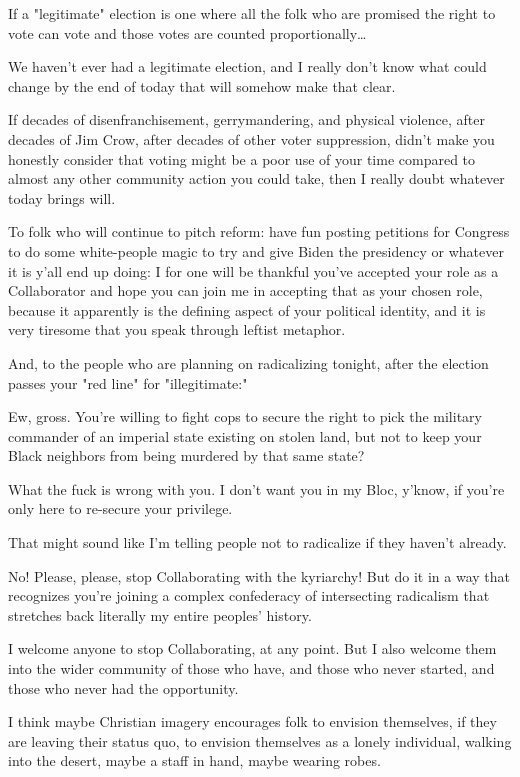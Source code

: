 \documentclass[11pt]{article}
\begin{document}
\begin{itemize}
If a "legitimate" election is one where all the folk who are promised the right to vote can vote and those votes are counted proportionally…

We haven't ever had a legitimate election, and I really don't know what could change by the end of today that will somehow make that clear.

If decades of disenfranchisement, gerrymandering, and physical violence, after decades of Jim Crow, after decades of other voter suppression, didn't make you honestly consider that voting might be a poor use of your time compared to almost any other community action you could take, then I really doubt whatever today brings will.

To folk who will continue to pitch reform: have fun posting petitions for Congress to do some white-people magic to try and give Biden the presidency or whatever it is y'all end up doing: I for one will be thankful you've accepted your role as a Collaborator and hope you can join me in accepting that as your chosen role, because it apparently is the defining aspect of your political identity, and it is very tiresome that you speak through leftist metaphor.

And, to the people who are planning on radicalizing tonight, after the election passes your "red line" for "illegitimate:"

Ew, gross. You're willing to fight cops to secure the right to pick the military commander of an imperial state existing on stolen land, but not to keep your Black neighbors from being murdered by that same state?

What the fuck is wrong with you. I don't want you in my Bloc, y'know, if you're only here to re-secure your privilege.

That might sound like I'm telling people not to radicalize if they haven't already.

No! Please, please, stop Collaborating with the kyriarchy! But do it in a way that recognizes you're joining a complex confederacy of intersecting radicalism that stretches back literally my entire peoples' history.

I welcome anyone to stop Collaborating, at any point. But I also welcome them into the wider community of those who have, and those who never started, and those who never had the opportunity.

I think maybe Christian imagery encourages folk to envision themselves, if they are leaving their status quo, to envision themselves as a lonely individual, walking into the desert, maybe a staff in hand, maybe wearing robes.


\end{itemize}
\end{document}
